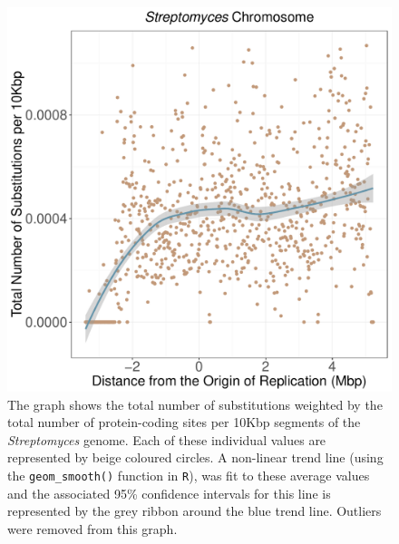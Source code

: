 \documentclass[11pt]{article}
\newcommand{\strep}{\textit{Streptomyces}\xspace}
\begin{document}
\begin{figure}[h]
	\begin{center}
		\includegraphics[width=\textwidth]{./figs/strep_10KB_weighted_subs_nonpar_23Sep20.pdf}
		\caption{\label{fig:strep_nonpar}The graph shows the total number of substitutions weighted by the total number of protein-coding sites per 10Kbp segments of the \strep genome. Each of these individual values are represented by beige coloured circles. A non-linear trend line (using the \texttt{geom\_smooth()} function in \texttt{R}), was fit to these average values and the associated 95\% confidence intervals for this line is represented by the grey ribbon around the blue trend line. Outliers were removed from this graph.}
	\end{center}
\end{figure}
\end{document}
